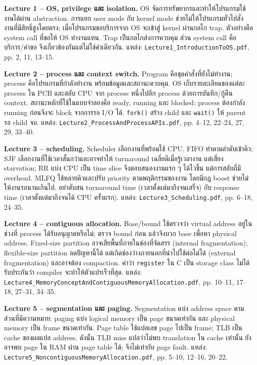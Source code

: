 \noindent\textbf{Lecture 1 -- OS, privilege และ isolation.} OS จัดการทรัพยากรและทำให้โปรแกรมใช้งานได้ผ่าน abstraction. การแยก user mode กับ kernel mode ช่วยไม่ให้โปรแกรมทั่วไปสั่งงานที่มีสิทธิ์สูงโดยตรง; เมื่อโปรแกรมขอบริการจาก OS จะเข้าสู่ kernel ผ่านกลไก trap. ตัวอย่างคือ system call ที่ขอให้ OS ทำงานแทน. Trap เป็นกลไกส่งการควบคุม ส่วน system call คือบริการ/คำขอ จึงเกี่ยวข้องกันแต่ไม่ใช่คำเดียวกัน. แหล่ง: \texttt{Lecture1\_IntroductionToOS.pdf}, pp. 2, 11, 13--15.\par
\noindent\textbf{Lecture 2 -- process และ context switch.} Program คือชุดคำสั่งที่ยังไม่ทำงาน; process คือโปรแกรมที่กำลังทำงาน พร้อมข้อมูลและสถานะควบคุม. OS เก็บรายละเอียดของแต่ละ process ใน PCB และสลับ CPU จาก process หนึ่งไปอีก process ด้วยการบันทึก/กู้คืน context. สถานะหลักที่ใช้ในแบบจำลองคือ ready, running และ blocked: process ต้องกำลัง running ก่อนจึงจะ block จากการรอ I/O ได้. \texttt{fork()} สร้าง child และ \texttt{wait()} ให้ parent รอ child จบ. แหล่ง: \texttt{Lecture2\_ProcessAndProcessAPIs.pdf}, pp. 4--12, 22--24, 27, 29, 33--40.\par
\noindent\textbf{Lecture 3 -- scheduling.} Scheduler เลือกงานที่พร้อมใช้ CPU. FIFO ทำตามลำดับเข้าคิว; SJF เลือกงานที่ใช้เวลาสั้นกว่าและอาจทำให้ turnaround เฉลี่ยดีเมื่อรู้เวลางาน แต่เสี่ยง starvation; RR แบ่ง CPU เป็น time slice จึงตอบสนองงานแรก ๆ ได้ไวขึ้น แต่การสลับถี่มี overhead. MLFQ ใช้หลายคิวและปรับ priority ตามพฤติกรรมของงาน โดยมีกฎ boost ช่วยไม่ให้งานรอนานเกินไป. อย่าสับสน turnaround time (เวลาตั้งแต่มาถึงจนเสร็จ) กับ response time (เวลาตั้งแต่มาถึงจนได้ CPU ครั้งแรก). แหล่ง: \texttt{Lecture3\_Scheduling.pdf}, pp. 6--18, 24--35.\par
\noindent\textbf{Lecture 4 -- contiguous allocation.} Base/bound ใช้ตรวจว่า virtual address อยู่ในช่วงที่ process ได้รับอนุญาตหรือไม่; ตรวจ bound ก่อน แล้วจึงบวก base เพื่อหา physical address. Fixed-size partition อาจเสียพื้นที่ภายในช่องที่จัดสรร (internal fragmentation); flexible-size partition ลดปัญหานี้ได้ แต่เกิดช่องว่างภายนอกที่นำไปใช้ต่อไม่ได้ (external fragmentation) และอาจต้อง compaction. คำว่า \texttt{register} ใน C เป็น storage class ไม่ได้รับประกันว่า compiler จะทำให้ตัวแปรเร็วที่สุด. แหล่ง: \texttt{Lecture4\_MemoryConceptAndContiguousMemoryAllocation.pdf}, pp. 10--11, 17--18, 27--31, 34--35.\par
\noindent\textbf{Lecture 5 -- segmentation และ paging.} Segmentation แบ่ง address space ตามส่วนที่มีความหมาย; paging แบ่ง logical memory เป็น page ขนาดเท่ากัน และ physical memory เป็น frame ขนาดเท่ากัน. Page table ใช้แปลเลข page ไปเป็น frame; TLB เป็น cache ของผลแปล address. ดังนั้น TLB miss แปลว่าไม่พบ translation ใน cache เท่านั้น ยังอาจพบ page ใน RAM ผ่าน page table ได้; จึงไม่เท่ากับ page fault. แหล่ง: \texttt{Lecture5\_NoncontiguousMemoryAllocation.pdf}, pp. 5--10, 12--16, 20--22.\par
